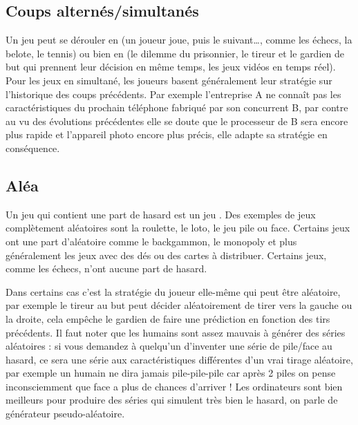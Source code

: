 \documentclass[11pt,class=report,crop=false]{standalone}
\begin{document}
\subsection{Coups alternés/simultanés}

Un jeu peut se dérouler en  (un joueur joue, puis le suivant\ldots, comme les échecs, la belote, le tennis) ou bien en  (le dilemme du prisonnier, le tireur et le gardien de but qui prennent leur décision en même temps, les jeux vidéos en temps réel). 
Pour les jeux en simultané, les joueurs basent généralement leur stratégie sur l'historique des coups précédents. Par exemple l'entreprise A ne connaît pas les caractéristiques du prochain téléphone fabriqué par son concurrent B, par contre au vu des évolutions précédentes elle se doute que le processeur de B sera encore plus rapide et l'appareil photo encore plus précis, elle adapte sa stratégie en conséquence.


\subsection{Aléa}

Un jeu qui contient une part de hasard est un jeu .
Des exemples de jeux complètement aléatoires sont la roulette, le loto, le jeu pile ou face. Certains jeux ont une part d'aléatoire comme le backgammon, le monopoly et plus généralement les jeux avec des dés ou des cartes à distribuer. Certains jeux, comme les échecs, n'ont aucune part de hasard.

Dans certains cas c'est la stratégie du joueur elle-même qui peut être aléatoire, par exemple le tireur au but peut décider aléatoirement de tirer vers la gauche ou la droite, cela empêche le gardien de faire une prédiction en fonction des tirs précédents.
Il faut noter que les humains sont assez mauvais à générer des séries aléatoires : si vous demandez à quelqu'un d'inventer une série de pile/face au hasard, ce sera une série aux caractéristiques différentes d'un vrai tirage aléatoire, par exemple un humain ne dira jamais \og{}pile-pile-pile\fg{} car après 2 \og{}piles\fg{} on pense inconsciemment que \og{}face\fg{} a plus de chances d'arriver ! 
Les ordinateurs sont bien meilleurs pour produire des séries qui simulent très bien le hasard, on parle de générateur \og{}pseudo-aléatoire\fg{}.


\end{document}
